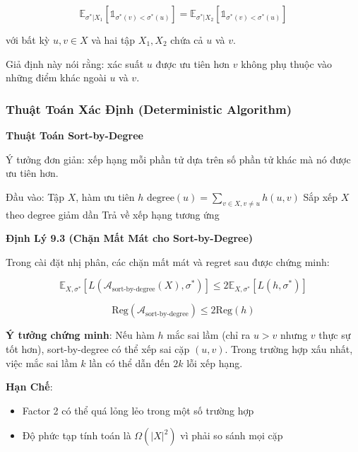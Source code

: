 \begin{equation}
\mathbb{E}_{\sigma^*|X_1}[\mathbb{1}_{\sigma^*(v) < \sigma^*(u)}] = \mathbb{E}_{\sigma^*|X_2}[\mathbb{1}_{\sigma^*(v) < \sigma^*(u)}]
\end{equation}

với bất kỳ $u,v \in X$ và hai tập $X_1, X_2$ chứa cả $u$ và $v$.

Giả định này nói rằng: xác suất $u$ được ưu tiên hơn $v$ không phụ thuộc vào những điểm khác ngoài $u$ và $v$.

\subsubsection{Thuật Toán Xác Định (Deterministic Algorithm)}

\textbf{Thuật Toán Sort-by-Degree}

Ý tưởng đơn giản: xếp hạng mỗi phần tử dựa trên số phần tử khác mà nó được ưu tiên hơn.

\begin{algorithmic}
\State Đầu vào: Tập $X$, hàm ưu tiên $h$
    \State $\text{degree}(u) = \sum_{v \in X, v \neq u} h(u, v)$
\EndFor
\State Sắp xếp $X$ theo $\text{degree}$ giảm dần
\State Trả về xếp hạng tương ứng
\end{algorithmic}

\textbf{Định Lý 9.3 (Chặn Mất Mát cho Sort-by-Degree)}

Trong cài đặt nhị phân, các chặn mất mát và regret sau được chứng minh:

\begin{equation}
\mathbb{E}_{X,\sigma^*}[L(\mathcal{A}_{\text{sort-by-degree}}(X), \sigma^*)] \leq 2 \mathbb{E}_{X,\sigma^*}[L(h, \sigma^*)]
\end{equation}

\begin{equation}
\text{Reg}(\mathcal{A}_{\text{sort-by-degree}}) \leq 2 \text{Reg}(h)
\end{equation}

\textbf{Ý tưởng chứng minh}: Nếu hàm $h$ mắc sai lầm (chỉ ra $u > v$ nhưng $v$ thực sự tốt hơn), sort-by-degree có thể xếp sai cặp $(u,v)$. Trong trường hợp xấu nhất, việc mắc sai lầm $k$ lần có thể dẫn đến $2k$ lỗi xếp hạng.

\textbf{Hạn Chế}:
\begin{itemize}
    \item Factor 2 có thể quá lỏng lẻo trong một số trường hợp
    \item Độ phức tạp tính toán là $\Omega(|X|^2)$ vì phải so sánh mọi cặp
\end{itemize}

